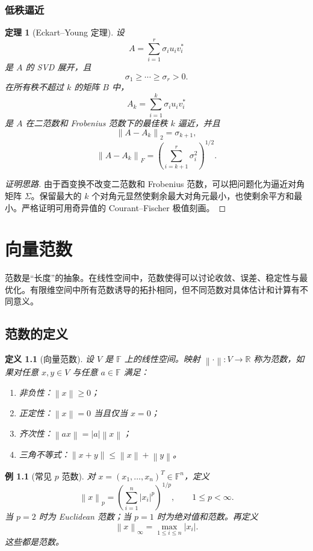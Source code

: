 \documentclass[UTF8,openany,zihao=-4]{ctexbook}
\theoremstyle{cnplain}
\newtheorem{definition}{定义}[chapter]
\newtheorem{theorem}{定理}[chapter]
\newtheorem{example}{例}[chapter]
\newcommand{\F}{\mathbb F}
\newcommand{\R}{\mathbb R}
\newcommand{\norm}[1]{\left\lVert #1\right\rVert}
\newcommand{\abs}[1]{\left\lvert #1\right\rvert}
\begin{document}
\subsection{低秩逼近}

\begin{theorem}[Eckart--Young 定理]
设
\[
A=\sum_{i=1}^r\sigma_i u_iv_i^*
\]
是 $A$ 的 SVD 展开，且
\[
\sigma_1\ge\cdots\ge\sigma_r>0.
\]
在所有秩不超过 $k$ 的矩阵 $B$ 中，
\[
A_k=\sum_{i=1}^k\sigma_i u_iv_i^*
\]
是 $A$ 在二范数和 Frobenius 范数下的最佳秩 $k$ 逼近，并且
\[
\norm{A-A_k}_2=\sigma_{k+1},
\]
\[
\norm{A-A_k}_F=\left(\sum_{i=k+1}^r\sigma_i^2\right)^{1/2}.
\]
\end{theorem}

\begin{proof}[证明思路]
由于酉变换不改变二范数和 Frobenius 范数，可以把问题化为逼近对角矩阵 $\Sigma$。保留最大的 $k$ 个对角元显然使剩余最大对角元最小，也使剩余平方和最小。严格证明可用奇异值的 Courant--Fischer 极值刻画。
\end{proof}

\chapter{向量范数}

范数是“长度”的抽象。在线性空间中，范数使得可以讨论收敛、误差、稳定性与最优化。有限维空间中所有范数诱导的拓扑相同，但不同范数对具体估计和计算有不同意义。

\section{范数的定义}

\begin{definition}[向量范数]
设 $V$ 是 $\F$ 上的线性空间。映射 $\norm{\cdot}:V\to\R$ 称为范数，如果对任意 $x,y\in V$ 与任意 $a\in\F$ 满足：
\begin{enumerate}
  \item 非负性：$\norm{x}\ge0$；
  \item 正定性：$\norm{x}=0$ 当且仅当 $x=0$；
  \item 齐次性：$\norm{ax}=\abs{a}\norm{x}$；
  \item 三角不等式：$\norm{x+y}\le\norm{x}+\norm{y}$。
\end{enumerate}
\end{definition}

\begin{example}[常见 $p$ 范数]
对 $x=(x_1,
\ldots,x_n)^T\in\F^n$，定义
\[
\norm{x}_p=\left(\sum_{i=1}^n\abs{x_i}^p\right)^{1/p},
\qquad 1\le p<\infty.
\]
当 $p=2$ 时为 Euclidean 范数；当 $p=1$ 时为绝对值和范数。再定义
\[
\norm{x}_\infty=\max_{1\le i\le n}\abs{x_i}.
\]
这些都是范数。
\end{example}
\end{document}
